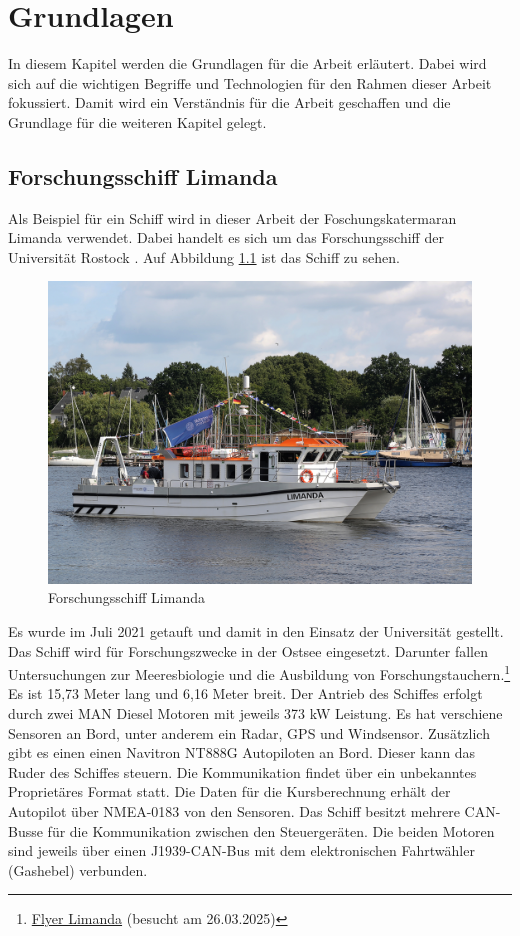 \chapter{Grundlagen}


In diesem Kapitel werden die Grundlagen für die Arbeit erläutert.
Dabei wird sich auf die wichtigen Begriffe und Technologien für den Rahmen dieser Arbeit fokussiert.
Damit wird ein Verständnis für die Arbeit geschaffen und die Grundlage für die weiteren Kapitel gelegt.

\section{Forschungsschiff Limanda}
Als Beispiel für ein Schiff wird in dieser Arbeit der Foschungskatermaran Limanda verwendet. Dabei handelt es sich um das 
Forschungsschiff der Universität Rostock \cite{limanda}. Auf Abbildung \ref{fig:limanda} ist das Schiff zu sehen. 
\begin{figure}[H]
    \centering
    \includegraphics[scale=0.6]{images/limanda.jpg}
    \caption{Forschungsschiff Limanda \cite{limanda}}
    \label{fig:limanda}
\end{figure} 

Es wurde im Juli 2021 getauft und damit in den Einsatz der Universität gestellt. Das Schiff wird für Forschungszwecke 
in der Ostsee eingesetzt. Darunter fallen Untersuchungen zur Meeresbiologie und die Ausbildung von 
Forschungstauchern.\footnote{\href{https://www.inf.uni-rostock.de/storages/uni-rostock/Alle_INF/INF/Flyer\_Limanda.pdf}{Flyer Limanda} (besucht am 26.03.2025)}
Es ist 15,73 Meter lang und 6,16 Meter breit. Der Antrieb des Schiffes erfolgt durch zwei MAN Diesel Motoren mit jeweils 373 kW Leistung.
Es hat verschiene Sensoren an Bord, unter anderem ein Radar, GPS und Windsensor. Zusätzlich gibt es einen einen 
Navitron NT888G Autopiloten an Bord. Dieser kann das Ruder des Schiffes steuern. Die Kommunikation findet über ein unbekanntes
Proprietäres Format statt. Die Daten für die Kursberechnung erhält der Autopilot über NMEA-0183 von den Sensoren.
Das Schiff besitzt mehrere CAN-Busse für die Kommunikation zwischen den Steuergeräten. Die beiden Motoren 
sind jeweils über einen J1939-CAN-Bus mit dem elektronischen Fahrtwähler (Gashebel) verbunden.

